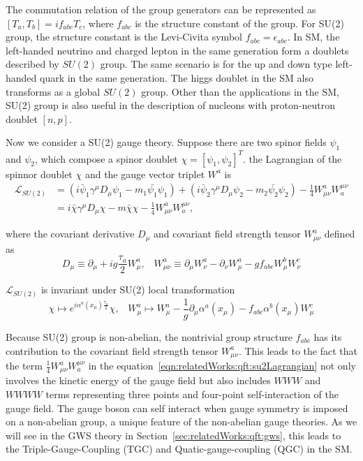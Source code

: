 \noindent The commutation relation of the group generators can be represented as $[T_a, T_b] = i f_{abc} T_c$, where $f_{abc}$ is the structure constant of the group. For SU(2) group, the structure constant is the Levi-Civita symbol $f_{abc}=\epsilon_{abc}$. In SM, the left-handed neutrino and charged lepton in the same generation form a doublets described by $SU(2)$ group. The same scenario is for the up and down type left-handed quark in the same generation. The higgs doublet in the SM also transforms as a global $SU(2)$ group. Other than the applications in the SM, SU(2) group is also useful in the description of nucleons with proton-neutron doublet $[n, p]$. 

\noindent Now we consider a SU(2) gauge theory. Suppose there are two spinor fields $\psi_1$ and $\psi_2$, which compose a spinor doublet $\chi = [ \psi_1, \psi_2 ]^T$. the Lagrangian of the spinnor doublet $\chi$ and the gauge vector triplet $W^a$ is
%
\begin{equation}
\begin{split}
    \mathcal{L}_{SU(2)}  &= (i\bar{\psi}_1\gamma^\mu D_\mu \psi_1  - m_1\bar{\psi_1} \psi_1) + (i\bar{\psi}_2\gamma^\mu D_\mu \psi_2  - m_2\bar{\psi_2} \psi_2)  - \frac{1}{4}W^a_{\mu\nu}W^{\mu\nu}_a \\
    &= i\bar{\chi}\gamma^\mu D_\mu \chi  - m\bar{\chi} \chi  - \frac{1}{4}W^a_{\mu\nu}W^{\mu\nu}_a,
\end{split}
\label{eqn:relatedWorks:qft:su2Lagrangian}
\end{equation}

\noindent where the covariant derivative $D_\mu$ and covariant field strength tensor $W^a_{\mu\nu}$ defined as
%
\begin{equation}
    D_\mu \equiv \partial_\mu +i g \frac{\tau_a}{2} W^a_\mu , \;\;\; 
    W^a_{\mu\nu} \equiv  \partial_\mu W^a_\nu - \partial_\nu W^a_\mu - g f_{abc} W^b_\mu W^c_\nu
\end{equation}

\noindent $\mathcal{L}_{SU(2)}$ is invariant under SU(2) local transformation 
%
\begin{equation}
	\chi \longmapsto  e^{i\alpha^a (x_\mu) \frac{\tau_a}{2}} \chi , \;\;\; 
    W^a_\mu \longmapsto  W^a_\mu - \frac{1}{g}\partial_\mu \alpha^a(x_\mu) - f_{abc}\alpha^b(x_\mu) W^c_\mu 
\end{equation}

\noindent Because SU(2) group is non-abelian, the nontrivial group structure $f_{abc}$ has its contribution to the covariant field strength tensor $W^a_{\mu\nu}$. This leads to the fact that the term $\frac{1}{4}W^a_{\mu\nu}W^{\mu\nu}_a$ in the equation~\ref{eqn:relatedWorks:qft:su2Lagrangian} not only involves the kinetic energy of the gauge field but also includes $WWW$ and $WWWW$ terms representing three points and four-point self-interaction of the gauge field. The gauge boson can self interact when gauge symmetry is imposed on a non-abelian group, a unique feature of the non-abelian gauge theories. As we will see in the GWS theory in Section~\ref{sec:relatedWorks:qft:gws}, this leads to the Triple-Gauge-Coupling (TGC) and Quatic-gauge-coupling (QGC) in the SM.




